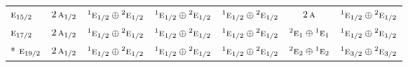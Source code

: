 \documentclass[10pt,a4paper]{article}
\numberwithin{equation}{section}
\newcommand{\irr}[1]{\text{\normalfont\scshape #1}}
\newcommand{\conjpair}[1]{{}^{#1}}
\begin{document}
{\begin{longtable}{@{}lcccccc@{}}
$\irr{e}_{15/2}$ & $2\,\irr{a}_{1/2}$ & $\conjpair{1}\irr{e}_{1/2}\oplus \conjpair{2}\irr{e}_{1/2}$ & $\conjpair{1}\irr{e}_{1/2}\oplus \conjpair{2}\irr{e}_{1/2}$ & $\conjpair{1}\irr{e}_{1/2}\oplus \conjpair{2}\irr{e}_{1/2}$ & $2\,\irr{a}$ & $\conjpair{1}\irr{e}_{1/2}\oplus \conjpair{2}\irr{e}_{1/2}$\\
$\irr{e}_{17/2}$ & $2\,\irr{a}_{1/2}$ & $\conjpair{1}\irr{e}_{1/2}\oplus \conjpair{2}\irr{e}_{1/2}$ & $\conjpair{1}\irr{e}_{1/2}\oplus \conjpair{2}\irr{e}_{1/2}$ & $\conjpair{1}\irr{e}_{1/2}\oplus \conjpair{2}\irr{e}_{1/2}$ & $\conjpair{2}\irr{e}_{1}\oplus \conjpair{1}\irr{e}_{1}$ & $\conjpair{1}\irr{e}_{1/2}\oplus \conjpair{2}\irr{e}_{1/2}$\\*
$\irr{e}_{19/2}$ & $2\,\irr{a}_{1/2}$ & $\conjpair{1}\irr{e}_{1/2}\oplus \conjpair{2}\irr{e}_{1/2}$ & $\conjpair{1}\irr{e}_{1/2}\oplus \conjpair{2}\irr{e}_{1/2}$ & $\conjpair{1}\irr{e}_{1/2}\oplus \conjpair{2}\irr{e}_{1/2}$ & $\conjpair{2}\irr{e}_{2}\oplus \conjpair{1}\irr{e}_{2}$ & $\conjpair{1}\irr{e}_{3/2}\oplus \conjpair{2}\irr{e}_{3/2}$\\
\bottomrule\end{longtable}}
\end{document}
